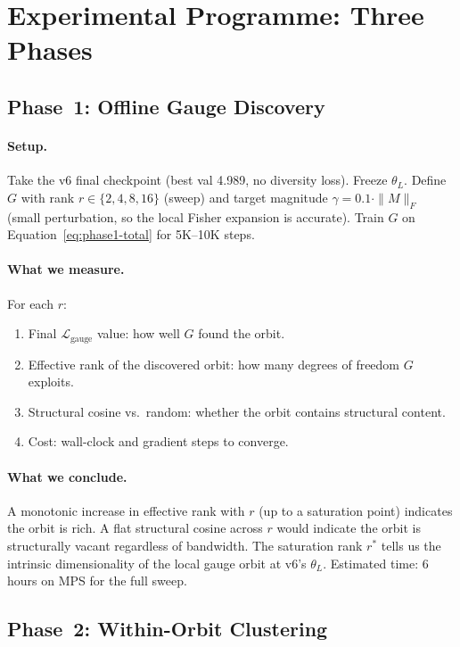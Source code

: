 \documentclass[11pt, a4paper]{article}
\theoremstyle{plain}
\theoremstyle{definition}
\theoremstyle{remark}
\begin{document}
\section{Experimental Programme: Three Phases}
\label{sec:programme-part2}

\subsection{Phase~1: Offline Gauge Discovery}

\paragraph{Setup.}
Take the v6 final checkpoint (best val 4.989, no diversity loss). Freeze $\theta_{L}$.
Define $G$ with rank $r \in \{2, 4, 8, 16\}$ (sweep) and target magnitude $\gamma = 0.1 \cdot \|M\|_{F}$ (small perturbation, so the local Fisher expansion is accurate).
Train $G$ on Equation~\ref{eq:phase1-total} for 5K--10K steps.

\paragraph{What we measure.}
For each $r$:
\begin{enumerate}[nosep]
\item Final $\mathcal{L}_{\text{gauge}}$ value: how well $G$ found the orbit.
\item Effective rank of the discovered orbit: how many degrees of freedom $G$ exploits.
\item Structural cosine vs.\ random: whether the orbit contains structural content.
\item Cost: wall-clock and gradient steps to converge.
\end{enumerate}

\paragraph{What we conclude.}
A monotonic increase in effective rank with $r$ (up to a saturation point) indicates the orbit is rich.
A flat structural cosine across $r$ would indicate the orbit is structurally vacant regardless of bandwidth.
The saturation rank $r^{*}$ tells us the intrinsic dimensionality of the local gauge orbit at v6's $\theta_{L}$.
Estimated time: 6 hours on MPS for the full sweep.

\subsection{Phase~2: Within-Orbit Clustering}
\end{document}
